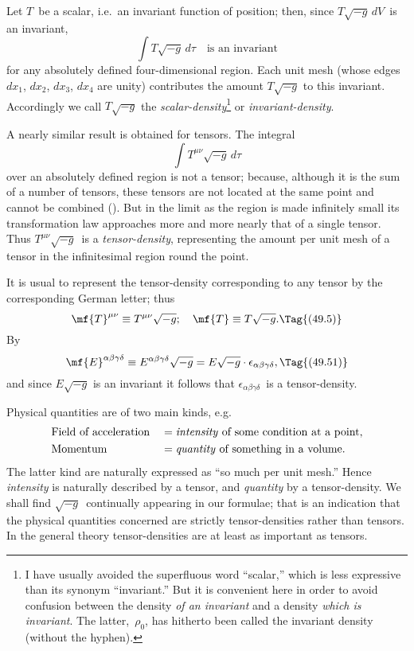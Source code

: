 \documentclass[12pt]{book}
\begin{document}
Let $T$~be a scalar, i.e.\ an invariant function of position; then, since
$T\sqrt{-g}\, dV$~is an invariant,
\[
\int T\sqrt{-g}\, d\tau\quad\text{is an invariant}
\]
for any absolutely defined four\hyp{}dimensional region. Each unit mesh (whose
edges $dx_{1}$, $dx_{2}$, $dx_{3}$, $dx_{4}$ are unity) contributes the amount $T\sqrt{-g}$ to this
invariant. Accordingly we call $T\sqrt{-g}$ the \emph{scalar\hyp{}density}\footnote
  {I have usually avoided the superfluous word ``scalar,'' which is less expressive than its
  synonym ``invariant.'' But it is convenient here in order to avoid confusion between the density
  \emph{of an invariant} and a density \emph{which is invariant}. The latter,~$\rho_{0}$, has hitherto been called the
  invariant density (without the hyphen).}
or \emph{invariant\hyp{}density}.
%
%
%

A nearly similar result is obtained for tensors. The integral
\[
\int T^{\mu\nu} \sqrt{-g}\, d\tau
\]
over an absolutely defined region is not a tensor; because, although it is the
sum of a number of tensors, these tensors are not located at the same point
and cannot be combined (). But in the limit as the region is made
infinitely small its transformation law approaches more and more nearly that
of a single tensor. Thus $T^{\mu\nu} \sqrt{-g}$~is a \emph{tensor\hyp{}density}, representing the amount
%
per unit mesh of a tensor in the infinitesimal region round the point.

It is usual to represent the tensor\hyp{}density corresponding to any tensor by
%
the corresponding German letter; thus
\[
\mf{T}^{\mu\nu} \equiv T^{\mu\nu} \sqrt{-g};\quad
\mf{T} \equiv T \sqrt{-g}.
\Tag{(49.5)}
\]
By 
\[
\mf{E}^{\alpha\beta\gamma\delta} \equiv E^{\alpha\beta\gamma\delta} \sqrt{-g}
= E \sqrt{-g} \cdot \epsilon_{\alpha\beta\gamma\delta},
\Tag{(49.51)}
\]
and since $E \sqrt{-g}$ is an invariant it follows that $\epsilon_{\alpha\beta\gamma\delta}$~is a tensor\hyp{}density.

Physical quantities are of two main kinds, e.g.\
%
%
\begin{alignat*}{2}
  &\text{Field of acceleration}
  &&= \text{\emph{intensity} of some condition at a point,} \\
    &\text{Momentum}
    &&= \text{\emph{quantity} of something in a volume.}
\end{alignat*}
The latter kind are naturally expressed as ``so much per unit mesh.'' Hence
\emph{intensity} is naturally described by a tensor, and \emph{quantity} by a tensor\hyp{}density.
We shall find $\sqrt{-g}$~continually appearing in our formulae; that is an indication
that the physical quantities concerned are strictly tensor\hyp{}densities rather
than tensors. In the general theory tensor\hyp{}densities are at least as important
as tensors.
\end{document}
